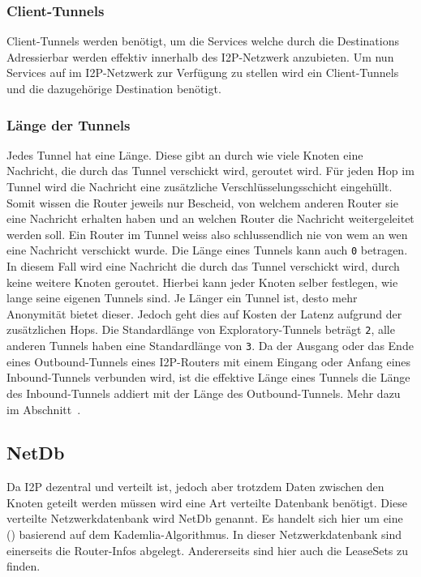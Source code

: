 \subsubsection{Client-Tunnels}

Client-Tunnels werden benötigt, um die Services welche durch die Destinations Adressierbar werden effektiv innerhalb des I2P-Netzwerk anzubieten.
Um nun Services auf im I2P-Netzwerk zur Verfügung zu stellen wird ein Client-Tunnels und die dazugehörige Destination benötigt.

\subsubsection{Länge der Tunnels}

Jedes Tunnel hat eine Länge.
Diese gibt an durch wie viele Knoten eine Nachricht, die durch das Tunnel verschickt wird, geroutet wird.
Für jeden Hop im Tunnel wird die Nachricht eine zusätzliche Verschlüsselungsschicht eingehüllt.
Somit wissen die Router jeweils nur Bescheid, von welchem anderen Router sie eine Nachricht erhalten haben und an welchen Router die Nachricht weitergeleitet werden soll.
Ein Router im Tunnel weiss also schlussendlich nie von wem an wen eine Nachricht verschickt wurde.
Die Länge eines Tunnels kann auch \lstinline|0| betragen.
In diesem Fall wird eine Nachricht die durch das Tunnel verschickt wird, durch keine weitere Knoten geroutet.
Hierbei kann jeder Knoten selber festlegen, wie lange seine eigenen Tunnels sind.
Je Länger ein Tunnel ist, desto mehr Anonymität bietet dieser.
Jedoch geht dies auf Kosten der Latenz aufgrund der zusätzlichen Hops.
Die Standardlänge von Exploratory-Tunnels beträgt \lstinline|2|, alle anderen Tunnels haben eine Standardlänge von \lstinline|3|.
Da der Ausgang oder das Ende eines Outbound-Tunnels eines I2P-Routers mit einem Eingang oder Anfang eines Inbound-Tunnels verbunden wird,
ist die effektive Länge eines Tunnels die Länge des Inbound-Tunnels addiert mit der Länge des Outbound-Tunnels. Mehr dazu im Abschnitt~.
\cite{noauthor_i2p_nodate-3}

\subsection{NetDb}\label{sec:netdb}

Da I2P dezentral und verteilt ist, jedoch aber trotzdem Daten zwischen den Knoten geteilt werden müssen wird eine Art verteilte Datenbank benötigt.
Diese verteilte Netzwerkdatenbank wird NetDb genannt.
Es handelt sich hier um eine  () basierend auf dem Kademlia-Algorithmus.
In dieser Netzwerkdatenbank sind einerseits die Router-Infos abgelegt.
Andererseits sind hier auch die LeaseSets zu finden.
\parencite{noauthor_network_nodate}

